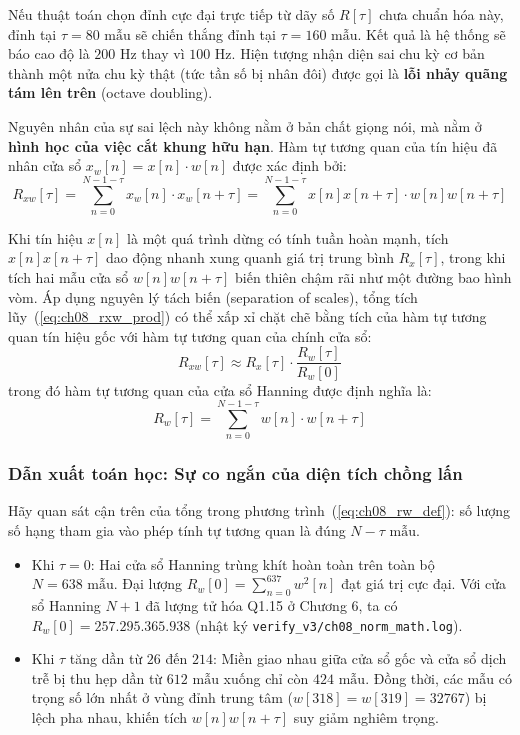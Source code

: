 Nếu thuật toán chọn đỉnh cực đại trực tiếp từ dãy số $R[\tau]$ chưa chuẩn hóa này, đỉnh tại $\tau = 80\text{ mẫu}$ sẽ chiến thắng đỉnh tại $\tau = 160\text{ mẫu}$. Kết quả là hệ thống sẽ báo cao độ là $200\text{ Hz}$ thay vì $100\text{ Hz}$. Hiện tượng nhận diện sai chu kỳ cơ bản thành một nửa chu kỳ thật (tức tần số bị nhân đôi) được gọi là \textbf{lỗi nhảy quãng tám lên trên} (octave doubling).

Nguyên nhân của sự sai lệch này không nằm ở bản chất giọng nói, mà nằm ở \textbf{hình học của việc cắt khung hữu hạn}. Hàm tự tương quan của tín hiệu đã nhân cửa sổ $x_w[n] = x[n] \cdot w[n]$ được xác định bởi:
\begin{equation}
R_{xw}[\tau] = \sum_{n=0}^{N-1-\tau} x_w[n] \cdot x_w[n+\tau] = \sum_{n=0}^{N-1-\tau} x[n] x[n+\tau] \cdot w[n] w[n+\tau]
\label{eq:ch08_rxw_prod}
\end{equation}

Khi tín hiệu $x[n]$ là một quá trình dừng có tính tuần hoàn mạnh, tích $x[n] x[n+\tau]$ dao động nhanh xung quanh giá trị trung bình $R_x[\tau]$, trong khi tích hai mẫu cửa sổ $w[n] w[n+\tau]$ biến thiên chậm rãi như một đường bao hình vòm. Áp dụng nguyên lý tách biến (separation of scales), tổng tích lũy~(\ref{eq:ch08_rxw_prod}) có thể xấp xỉ chặt chẽ bằng tích của hàm tự tương quan tín hiệu gốc với hàm tự tương quan của chính cửa sổ:
\begin{equation}
R_{xw}[\tau] \approx R_x[\tau] \cdot \frac{R_w[\tau]}{R_w[0]}
\label{eq:ch08_separation}
\end{equation}
trong đó hàm tự tương quan của cửa sổ Hanning được định nghĩa là:
\begin{equation}
R_w[\tau] = \sum_{n=0}^{N-1-\tau} w[n] \cdot w[n+\tau]
\label{eq:ch08_rw_def}
\end{equation}

\subsubsection*{Dẫn xuất toán học: Sự co ngắn của diện tích chồng lấn}
Hãy quan sát cận trên của tổng trong phương trình~(\ref{eq:ch08_rw_def}): số lượng số hạng tham gia vào phép tính tự tương quan là đúng $N - \tau\text{ mẫu}$. 
\begin{itemize}[leftmargin=1.5em, itemsep=2pt]
    \item Khi $\tau = 0$: Hai cửa sổ Hanning trùng khít hoàn toàn trên toàn bộ $N = 638\text{ mẫu}$. Đại lượng $R_w[0] = \sum_{n=0}^{637} w^2[n]$ đạt giá trị cực đại. Với cửa sổ Hanning $N+1$ đã lượng tử hóa Q1.15 ở Chương 6, ta có $R_w[0] = 257.295.365.938$ (nhật ký \texttt{verify\_v3/ch08\_norm\_math.log}).
    \item Khi $\tau$ tăng dần từ $26$ đến $214$: Miền giao nhau giữa cửa sổ gốc và cửa sổ dịch trễ bị thu hẹp dần từ $612\text{ mẫu}$ xuống chỉ còn $424\text{ mẫu}$. Đồng thời, các mẫu có trọng số lớn nhất ở vùng đỉnh trung tâm ($w[318] = w[319] = 32767$) bị lệch pha nhau, khiến tích $w[n] w[n+\tau]$ suy giảm nghiêm trọng.
\end{itemize}

